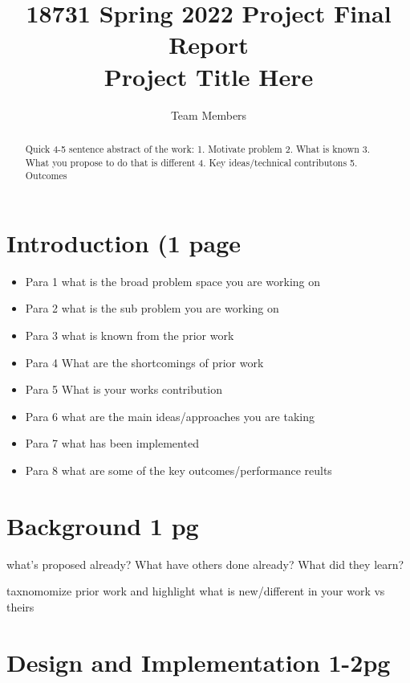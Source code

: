 \documentclass[twocolumn,10pt]{article}
\begin{document}
\title{18731 Spring 2022 Project Final Report\\ Project Title Here} %

\author{
  Team Members
}

\maketitle

\begin{abstract}
  Quick 4-5 sentence abstract of the work:
  1. Motivate problem 2. What is known 3. What you propose to do that is different 4. Key ideas/technical contributons  5.  Outcomes
\end{abstract}


\section{Introduction (1 page}

\begin{itemize}
  \item Para 1 what is the broad problem space you are working on
  \item Para 2 what is the sub problem you are working on
  \item Para 3 what is known from the prior work
  \item Para 4 What are the shortcomings of prior work
  \item Para 5 What is your works contribution
  \item Para 6 what are the main ideas/approaches you are taking
  \item Para 7 what has been implemented
  \item Para 8 what are some of the key outcomes/performance reults
\end{itemize}

\section{Background 1 pg}

what’s proposed already? What have others done already? What
did they learn?


taxnomomize prior work and highlight what is new/different in your work vs theirs


\section{Design and Implementation 1-2pg}
\end{document}
